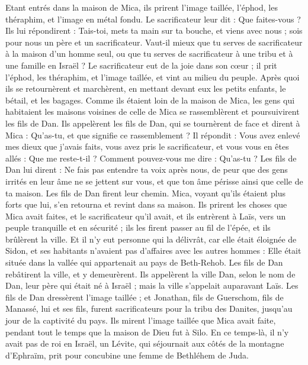 \begin{multicols}{2}
Etant entrés dans la maison de Mica, ils prirent l'image taillée, l'éphod, les théraphim, et l'image en métal fondu. Le sacrificateur leur dit : Que faites-vous ?
Ils lui répondirent : Tais-toi, mets ta main sur ta bouche, et viens avec nous ; sois pour nous un père et un sacrificateur. Vaut-il mieux que tu serves de sacrificateur à la maison d'un homme seul, ou que tu serves de sacrificateur à une tribu et à une famille en Israël ?
Le sacrificateur eut de la joie dans son cœur ; il prit l'éphod, les théraphim, et l'image taillée, et vint au milieu du peuple.
Après quoi ils se retournèrent et marchèrent, en mettant devant eux les petits enfants, le bétail, et les bagages.
Comme ils étaient loin de la maison de Mica, les gens qui  habitaient les maisons voisines de celle de Mica se rassemblèrent et poursuivirent les fils de Dan.
Ils appelèrent les fils de Dan, qui se tournèrent de face et dirent à Mica : Qu'as-tu, et que signifie ce rassemblement ?
Il répondit : Vous avez enlevé mes dieux que j'avais faits, vous avez pris le sacrificateur, et vous vous en êtes allés : Que me reste-t-il ? Comment pouvez-vous me dire : Qu'as-tu ?
Les fils de Dan lui dirent : Ne fais pas entendre ta voix après nous, de peur que des gens irrités en leur âme ne se jettent sur vous, et que ton âme périsse ainsi que celle de ta maison.
Les fils de Dan firent leur chemin. Mica, voyant qu'ils étaient plus forts que lui, s'en retourna et revint dans sa maison.
Ils prirent les choses que Mica avait faites, et le sacrificateur qu'il avait, et ils entrèrent à Laïs, vers un peuple tranquille et en sécurité ; ils les firent passer au fil de l'épée, et ils brûlèrent la ville.
Et il n'y eut personne qui la délivrât, car elle était éloignée de Sidon, et ses habitants n'avaient pas d'affaires avec les autres hommes : Elle était située dans la vallée qui appartenait au pays de Beth-Rehob. Les fils de Dan rebâtirent la ville, et y demeurèrent.
Ils appelèrent la ville Dan, selon le nom de Dan, leur père qui était né à Israël ; mais la ville s'appelait auparavant Laïs.
Les fils de Dan dressèrent l'image taillée ; et Jonathan, fils de Guerschom, fils de Manassé, lui et ses fils, furent sacrificateurs pour la tribu des Danites, jusqu'au jour de la captivité du pays.
Ils mirent l'image taillée que Mica avait faite, pendant tout le temps que la maison de Dieu fut à Silo.
\VerseOne{}En ce temps-là, il n'y avait pas de roi en Israël, un Lévite, qui séjournait aux côtés de la montagne d'Ephraïm, prit pour concubine une femme de Bethléhem de Juda.

\end{multicols}
